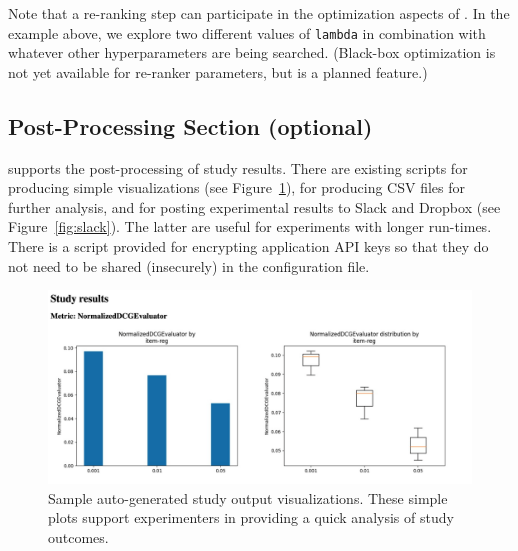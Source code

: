 Note that a re-ranking step can participate in the optimization aspects of \libauto{}. In the example above, we explore two different values of \texttt{lambda} in combination with whatever other hyperparameters are being searched. (Black-box optimization is not yet available for re-ranker parameters, but is a planned feature.)

\subsection{Post-Processing Section (optional)}
\libauto{} supports the post-processing of study results. There are existing scripts for producing simple visualizations (see Figure~\ref{fig:viz}), for producing CSV files for further analysis, and for posting experimental results to Slack and Dropbox (see Figure~\ref{fig:slack}). The latter are useful for experiments with longer run-times. There is a script provided for encrypting application API keys so that they do not need to be shared (insecurely) in the configuration file. 

\begin{figure}[ht!]
    \centering
    \includegraphics[width=0.8\linewidth]{figs/chapter6-librecauto/sample-output.png}
    \caption{Sample auto-generated study output visualizations. These simple plots support experimenters in providing a quick analysis of study outcomes.}
    \label{fig:viz}
    \vspace{-0.15in}
\end{figure}

